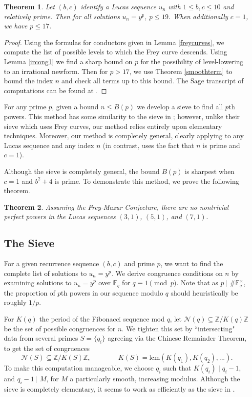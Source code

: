\documentclass[12pt]{amsart}
\newtheorem{thm}{Theorem}[section]
\theoremstyle{definition}
\theoremstyle{remark}
\def\F{{\mathbb F}}
\def\N{{\mathcal N}}
\def\Z{{\mathbb Z}}
\newcommand{\lcm}{\text{lcm}}
\begin{document}
\begin{thm} \label{conditional_bound_p}
Let $(b,c)$ identify a Lucas sequence $u_n$ with $1 \leq b,c \leq 10$ and relatively prime.  Then for all solutions $u_n = y^p$, $p \leq 19$. When additionally $c = 1$, we have $p \leq 17$.
\end{thm}
\begin{proof}
Using the formulas for conductors given in Lemma \ref{freycurves}, we compute the list of possible levels to which the Frey curve descends.  Using Lemma \ref{ircong1} we find a sharp bound on $p$ for the possibility of level-lowering to an irrational newform.  Then for $p > 17$, we use Theorem \ref{smoothterm} to bound the index $n$ and check all terms up to this bound.  The Sage transcript of computations can be found at \cite{code}.
\end{proof}

For any prime $p$, given a bound $n \leq B(p)$ we develop a sieve to find all $p$th powers.  This method has some similarity to the sieve in \cite{siksek06}; however, unlike their sieve which uses Frey curves, our method relies entirely upon elementary techniques.  Moreover, our method is completely general, clearly applying to any Lucas sequence and any index $n$ (in contrast, \cite{siksek06} uses the fact that $n$ is prime and $c = 1$).

Although the sieve is completely general, the bound $B(p)$ is sharpest when $c = 1$ and $b^2+4$ is prime.  To demonstrate this method, we prove the following theorem.

\begin{thm}\label{cond_examples}
Assuming the Frey-Mazur Conjecture, there are no nontrivial perfect powers in the Lucas sequences $(3,1)$, $(5,1)$, and $(7,1)$.
\end{thm}


\subsection{The Sieve}

For a given recurrence sequence $(b,c)$ and prime $p$, we want to find the complete list of solutions to $u_n = y^p$.  We derive congruence conditions on $n$ by examining solutions to $u_n = y^p$ over $\F_q$ for $q \equiv 1 \pmod{p}$.  Note that as $p \mid \#\F_q^\times$, the proportion of $p$th powers in our sequence modulo $q$ should heuristically be roughly $1/p$.

For $K(q)$ the period of the Fibonacci sequence mod $q$, let $\N(q) \subseteq \Z/K(q)\Z $ be the set of possible congruences for $n$.  We tighten this set by ``intersecting" data from several primes $S = \{q_i\}$ agreeing via the Chinese Remainder Theorem, to get the set of congruences
\[ \N(S) \subseteq \Z/K(S)\Z, \qquad \qquad K(S)= \lcm(K(q_1),K(q_2),...).\]  
To make this computation manageable,  we choose $q_i$ such that $K(q_i) \mid q_i-1$, and $q_i-1 \mid M$, for $M$ a particularly smooth, increasing modulus.  Although the sieve is completely elementary, it seems to work as efficiently as the sieve in \cite{siksek06}.
\end{document}
